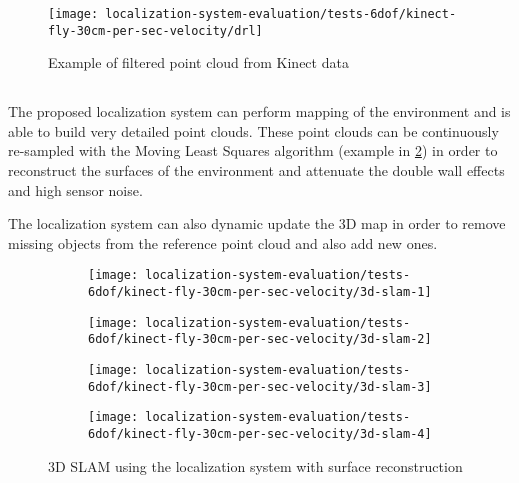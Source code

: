 \begin{figure}[H]
	\centering
	\texttt{[image: localization-system-evaluation/tests-6dof/kinect-fly-30cm-per-sec-velocity/drl]}
	\caption{Example of filtered point cloud from Kinect data}
	\label{fig:localization-system-evaluation_kinect-fly-30cm-per-sec-velocity-drl-filters}
\end{figure}


\subsection{}

The proposed localization system can perform mapping of the environment and is able to build very detailed point clouds. These point clouds can be continuously re-sampled with the Moving Least Squares algorithm (example in \cref{fig:localization-system-evaluation_kinect-fly-30cm-per-sec-velocity-drl-slam}) in order to reconstruct the surfaces of the environment and attenuate the double wall effects and high sensor noise.

The localization system can also dynamic update the 3D map in order to remove missing objects from the reference point cloud and also add new ones.


\begin{figure}[H]
	\centering
	\begin{subfigure}[ht]{0.45\textwidth}
		\centering
		\texttt{[image: localization-system-evaluation/tests-6dof/kinect-fly-30cm-per-sec-velocity/3d-slam-1]}
	\end{subfigure}
	\begin{subfigure}[ht]{0.45\textwidth}
		\centering
		\texttt{[image: localization-system-evaluation/tests-6dof/kinect-fly-30cm-per-sec-velocity/3d-slam-2]}
	\end{subfigure}
	\begin{subfigure}[ht]{0.45\textwidth}
		\centering
		\texttt{[image: localization-system-evaluation/tests-6dof/kinect-fly-30cm-per-sec-velocity/3d-slam-3]}
	\end{subfigure}
	\begin{subfigure}[ht]{0.45\textwidth}
		\centering
		\texttt{[image: localization-system-evaluation/tests-6dof/kinect-fly-30cm-per-sec-velocity/3d-slam-4]}
	\end{subfigure}
	\caption{3D SLAM using the localization system with surface reconstruction}
	\label{fig:localization-system-evaluation_kinect-fly-30cm-per-sec-velocity-drl-slam}
\end{figure}

